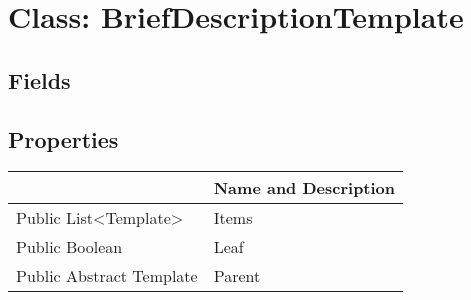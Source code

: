 \documentclass[11pt, oneside, a4paper]{book}
\begin{document}
\hypertarget{SoftwareEngineeringTools.{}Documentation.{}BriefDescriptionTemplate}{}
\section{Class: BriefDescriptionTemplate}

\subsection{Fields}

\subsection{Properties}
\begin{center}
\begin{tabular}{| p{3cm} | p{12cm} | }
\hline
\textbf{ } & \textbf{ Name and Description}\\
\hline
 Public  List<Template> &  Items\hypertarget{SoftwareEngineeringTools.{}Documentation.{}BriefDescriptionTemplate.{}Items}{}\\
\hline
 Public  Boolean &  Leaf\hypertarget{SoftwareEngineeringTools.{}Documentation.{}BriefDescriptionTemplate.{}Leaf}{}\\
\hline
 Public  Abstract  Template &  Parent\hypertarget{SoftwareEngineeringTools.{}Documentation.{}BriefDescriptionTemplate.{}Parent}{}\\
\hline
\end{tabular}
\end{center}
\end{document}
